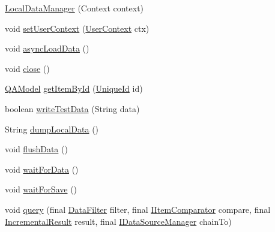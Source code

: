 \begin{DoxyCompactItemize}
\item 
\hyperlink{classcom_1_1ualberta_1_1team17_1_1datamanager_1_1_local_data_manager_a0a6de01dbd7cd03de949c1d88dcda90e}{Local\+Data\+Manager} (Context context)
\item 
void \hyperlink{classcom_1_1ualberta_1_1team17_1_1datamanager_1_1_local_data_manager_aa439cb9bc6cf62ce036db577147420d1}{set\+User\+Context} (\hyperlink{classcom_1_1ualberta_1_1team17_1_1datamanager_1_1_user_context}{User\+Context} ctx)
\item 
void \hyperlink{classcom_1_1ualberta_1_1team17_1_1datamanager_1_1_local_data_manager_a09842996e8cd296635c16d44ed212e87}{async\+Load\+Data} ()
\item 
void \hyperlink{classcom_1_1ualberta_1_1team17_1_1datamanager_1_1_local_data_manager_acfffacbed9c29994e000643879d8ce09}{close} ()
\item 
\hyperlink{classcom_1_1ualberta_1_1team17_1_1_q_a_model}{Q\+A\+Model} \hyperlink{classcom_1_1ualberta_1_1team17_1_1datamanager_1_1_local_data_manager_a2849e81c76ae0dc642ba4242f6b8b10f}{get\+Item\+By\+Id} (\hyperlink{classcom_1_1ualberta_1_1team17_1_1_unique_id}{Unique\+Id} id)
\item 
boolean \hyperlink{classcom_1_1ualberta_1_1team17_1_1datamanager_1_1_local_data_manager_add01440b6993bc27b01fb149a205bb4d}{write\+Test\+Data} (String data)
\item 
String \hyperlink{classcom_1_1ualberta_1_1team17_1_1datamanager_1_1_local_data_manager_a3953f8e749d0211632963880e758d474}{dump\+Local\+Data} ()
\item 
void \hyperlink{classcom_1_1ualberta_1_1team17_1_1datamanager_1_1_local_data_manager_a5a54365f00b1b1aa0661ef252c1a8d8e}{flush\+Data} ()
\item 
void \hyperlink{classcom_1_1ualberta_1_1team17_1_1datamanager_1_1_local_data_manager_aa3d65070cadb7b35102adf02fb94696b}{wait\+For\+Data} ()
\item 
void \hyperlink{classcom_1_1ualberta_1_1team17_1_1datamanager_1_1_local_data_manager_a5df023f4f9dbf533e29552ebcc4bff1f}{wait\+For\+Save} ()
\item 
void \hyperlink{classcom_1_1ualberta_1_1team17_1_1datamanager_1_1_local_data_manager_ad5f1c3b0e7678b723975c40b8f6bd7ac}{query} (final \hyperlink{classcom_1_1ualberta_1_1team17_1_1datamanager_1_1_data_filter}{Data\+Filter} filter, final \hyperlink{interfacecom_1_1ualberta_1_1team17_1_1datamanager_1_1_i_item_comparator}{I\+Item\+Comparator} compare, final \hyperlink{classcom_1_1ualberta_1_1team17_1_1datamanager_1_1_incremental_result}{Incremental\+Result} result, final \hyperlink{interfacecom_1_1ualberta_1_1team17_1_1datamanager_1_1_i_data_source_manager}{I\+Data\+Source\+Manager} chain\+To)

\end{DoxyCompactItemize}
